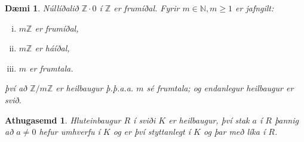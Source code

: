 \documentclass[a4paper,icelandic,11pt]{book}
\theoremstyle{plain}
\newtheorem{daemi}{Dæmi}[chapter]
\newtheorem*{ath}{Athugasemd}
\newcommand{\N}{\mathbb{N}}
\newcommand{\Z}{\mathbb{Z}}
\begin{document}
\begin{daemi}
  Núllíðalið $\Z\cdot 0$ í $\Z$ er frumíðal. Fyrir $m\in\N,m\geq 1$ er jafngilt:
  \begin{enumerate}[(i)]
    \item $m\Z$ er frumíðal,
    \item $m\Z$ er háíðal, 
    \item $m$ er frumtala. 
  \end{enumerate}
  því að $\Z/m\Z$ er heilbaugur þ.þ.a.a. $m$ sé frumtala; og endanlegur
  heilbaugur er svið.
\end{daemi}
\begin{ath}
  Hluteinbaugur $R$ í sviði $K$ er heilbaugur, því stak $a$ í $R$ þannig að
  $a\neq 0$ hefur umhverfu í $K$ og er því styttanlegt í $K$ og þar með líka í
  $R$.
\end{ath}
\end{document}
